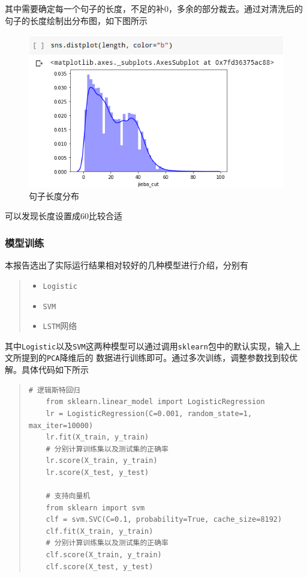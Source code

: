 \documentclass[UTF8]{ctexart}
\begin{document}
其中需要确定每一个句子的长度，不足的补0，多余的部分裁去。通过对清洗后的句子的长度绘制出分布图，如下图所示
\begin{figure}[htb]
    \centering
    \includegraphics[width=5in]{asset/句子长度.png}
    \caption{句子长度分布} %
\end{figure}

可以发现长度设置成60比较合适
\newpage
\subsubsection{模型训练}
本报告选出了实际运行结果相对较好的几种模型进行介绍，分别有

\begin{quote}
    \begin{itemize}
        \item \lstinline{Logistic}
        \item \lstinline{SVM}
        \item \lstinline{LSTM}网络
    \end{itemize}
\end{quote}

其中\lstinline{Logistic}以及\lstinline{SVM}这两种模型可以通过调用\lstinline{sklearn}包中的默认实现，输入上文所提到的\lstinline{PCA}降维后的
数据进行训练即可。通过多次训练，调整参数找到较优解。具体代码如下所示
\begin{quote}
    \begin{lstlisting}[]
    # 逻辑斯特回归
    from sklearn.linear_model import LogisticRegression
    lr = LogisticRegression(C=0.001, random_state=1, max_iter=10000)
    lr.fit(X_train, y_train)
    # 分别计算训练集以及测试集的正确率
    lr.score(X_train, y_train)
    lr.score(X_test, y_test)

    # 支持向量机
    from sklearn import svm
    clf = svm.SVC(C=0.1, probability=True, cache_size=8192)
    clf.fit(X_train, y_train)
    # 分别计算训练集以及测试集的正确率
    clf.score(X_train, y_train)
    clf.score(X_test, y_test)
    \end{lstlisting}
\end{quote}
\end{document}

